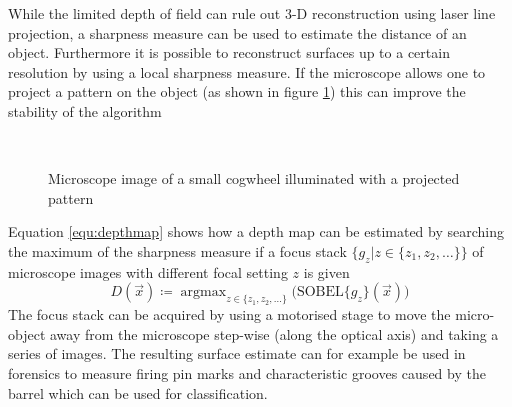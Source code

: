 \documentclass[a4paper,12pt]{book}
\begin{document}
While the limited depth of field can rule out 3-D reconstruction using
laser line projection, a sharpness measure can be used to estimate the
distance of an object. Furthermore it is possible to reconstruct surfaces up
to a certain resolution by using a local sharpness measure. If the microscope
allows one to project %
a pattern on the object (as shown in figure \ref{fig:smallwheelg}) this can
improve the stability of the algorithm
\begin{figure}[htbp]
   \begin{center}
     \\
     \caption{Microscope image of a small cogwheel illuminated with a projected
       pattern\cite{RefWorks:437}\label{fig:smallwheelg}}
   \end{center}
\end{figure}

Equation \ref{equ:depthmap} shows how a depth map can be estimated by
searching the maximum of the sharpness measure if a focus stack
$\{g_z|z\in\{z_1,z_2,\ldots\}\}$ of microscope images with different
focal setting $z$ is given
\begin{equation}\label{equ:depthmap}
  \displaystyle D(\vec{x})\coloneqq\mathop{\mathrm{argmax}}_{z\in\{z_1,z_2,\ldots\}}\big(\mathrm{SOBEL}\{g_z\}(\vec{x})\big)
\end{equation}
The focus stack can be acquired by using a motorised stage to move
the micro-object away from the microscope step-wise (along the optical axis)
and taking a series of images. The resulting surface estimate can for example
be used in forensics to measure firing pin marks and characteristic grooves
caused by the barrel which can be used for classification\cite{RefWorks:130}.
\end{document}

